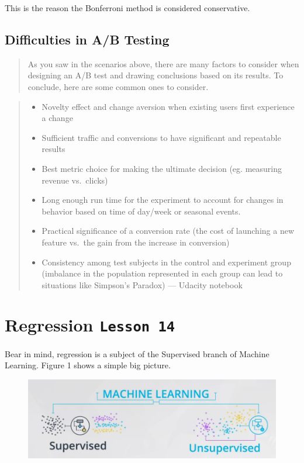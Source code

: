 \documentclass[]{book}
\providecommand{\tightlist}{%
  \setlength{\itemsep}{0pt}\setlength{\parskip}{0pt}}
\begin{document}
This is the reason the Bonferroni method is considered conservative.

\subsection{Difficulties in A/B
Testing}\label{difficulties-in-ab-testing}

\begin{quote}
As you saw in the scenarios above, there are many factors to consider
when designing an A/B test and drawing conclusions based on its results.
To conclude, here are some common ones to consider.
\end{quote}

\begin{quote}
\begin{itemize}
\tightlist
\item
  Novelty effect and change aversion when existing users first
  experience a change
\item
  Sufficient traffic and conversions to have significant and repeatable
  results
\item
  Best metric choice for making the ultimate decision (eg. measuring
  revenue vs.~clicks)
\item
  Long enough run time for the experiment to account for changes in
  behavior based on time of day/week or seasonal events.
\item
  Practical significance of a conversion rate (the cost of launching a
  new feature vs.~the gain from the increase in conversion)
\item
  Consistency among test subjects in the control and experiment group
  (imbalance in the population represented in each group can lead to
  situations like Simpson's Paradox) --- Udacity notebook
\end{itemize}
\end{quote}

\section{\texorpdfstring{Regression
\texttt{Lesson\ 14}}{Regression Lesson 14}}\label{regression-lesson-14}

Bear in mind, regression is a subject of the Supervised branch of
Machine Learning. Figure 1 shows a simple big picture.

\begin{figure}
\centering
\includegraphics{01-img/c4_l14_01.png}
\caption{}
\end{figure}
\end{document}
